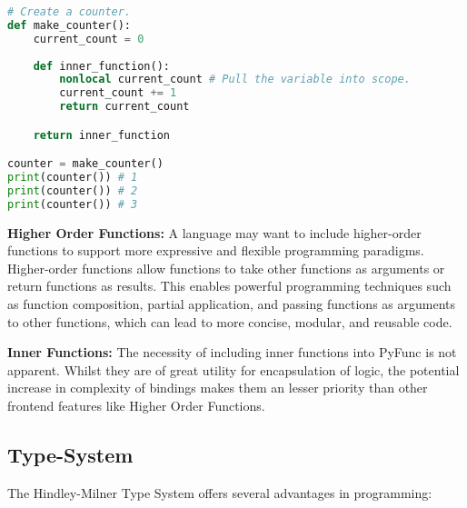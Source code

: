 \documentclass{l4proj}
\begin{document}
\begin{lstlisting}[language=Python, caption={An example of a closure in Python. See the use of the 'nonlocal' keyword to pull the surrounding defintion of 'current\_count' into the scope of 'inner\_function'.}, label={lst:py-closure}]
# Create a counter.
def make_counter():
    current_count = 0
    
    def inner_function():
        nonlocal current_count # Pull the variable into scope.
        current_count += 1
        return current_count

    return inner_function

counter = make_counter()
print(counter()) # 1
print(counter()) # 2
print(counter()) # 3
\end{lstlisting}


\textbf{Higher Order Functions:}
A language may want to include higher-order functions to support more expressive and flexible programming paradigms. 
Higher-order functions allow functions to take other functions as arguments or return functions as results.
This enables powerful programming techniques such as function composition, partial application, and passing functions as arguments to other functions, which can lead to more concise, modular, and reusable code.

\textbf{Inner Functions:}
The necessity of including inner functions into PyFunc is not apparent.
Whilst they are of great utility for encapsulation of logic, the potential increase in complexity of bindings makes them an lesser priority than other frontend features like Higher Order Functions.

\subsection{Type-System}
The Hindley-Milner Type System offers several advantages in programming:
\end{document}
